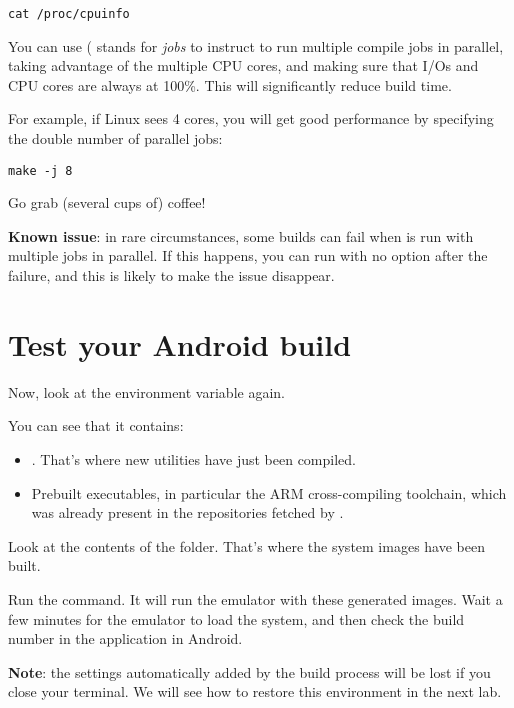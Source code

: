 \begin{verbatim}
cat /proc/cpuinfo
\end{verbatim}

You can use  ( stands for {\it jobs} to instruct 
to run multiple compile jobs in parallel, taking advantage of the multiple
CPU cores, and making sure that I/Os
and CPU cores are always at 100\%. This will significantly reduce build time.

For example, if Linux sees 4 cores, you will get good performance by specifying  
the double number of parallel jobs: 

\begin{verbatim}
make -j 8
\end{verbatim}

Go grab (several cups of) coffee!

\textbf{Known issue}: in rare circumstances, some builds can fail when 
is run with multiple jobs in parallel. If this happens, you can run 
with no option after the failure, and this is likely to make the issue disappear.

\section{Test your Android build}

Now, look at the  environment variable again.

You can see that it contains:
\begin{itemize}
   \item {}.
   That's where new utilities have just been compiled.
   \item Prebuilt executables, in particular the ARM cross-compiling toolchain,
   which was already present in the repositories fetched by .
\end{itemize}

Look at the contents of the  folder.
That's where the system images have been built.

Run the  command. It will run the emulator with these generated images.
Wait a few minutes for the emulator to load the system, and then 
check the build number in the  application in Android.

\textbf{Note}: the  settings automatically added by the build
process will be lost if you close your terminal. We will see how to restore
this environment in the next lab.
